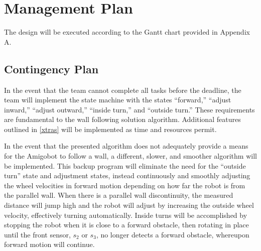 \section{Management Plan}
The design will be executed according to the Gantt chart provided in Appendix A. 

\subsection{Contingency Plan}
In the event that the team cannot complete all tasks before the
deadline, the team will implement the state machine with the states 
``forward,''  ``adjust inward,'' ``adjust outward,'' ``inside turn,'' and
``outside turn.'' These requirements are fundamental to the wall following 
solution algorithm. Additional features outlined in \ref{xtras} will 
be implemented as time and resources permit.  

In the event that the presented algorithm does not adequately provide
a means for the Amigobot to follow a wall, a different, slower, and smoother
algorithm will be implemented. This backup program will eliminate the
need for the ``outside turn'' state and adjustment states, instead
continuously and smoothly adjusting the wheel velocities in forward
motion depending on
how far the robot is from the parallel wall. When there is a parallel
wall discontinuity, the measured distance will jump high and the robot
will adjust by increasing the outside wheel velocity, effectively
turning automatically. Inside turns will be accomplished by stopping
the robot when it is close to a forward obstacle, then rotating in
place until the front sensor, \(s_2\) or \(s_3\), no longer detects a
forward obstacle, whereupon forward motion will continue.
